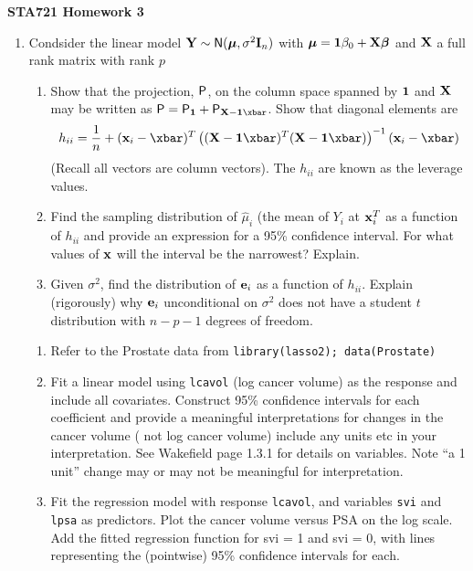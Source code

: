 \documentclass[12pt]{article}
\begin{document}
{\bf STA721 \hfill Homework 3}

\vspace{.5in}


\begin{enumerate}
\item Condsider the linear model $\Y \sim \N(\mub, \sigma^2 \I_n)$
  with  $\mub = \one \beta_0 + \X \b$ and $\X$ a full rank matrix with rank $p$
  \begin{enumerate}
  \item 

    Show that the projection, $\P$, on the column space spanned by
    $\one$ and $\X$ may be written as
    $\P = \P_{\one} + \P_{\X - \one \xbar}$.  Show that diagonal
    elements are
    $$h_{ii} = \frac{1}{n} + (\x_i-\xbar)^T\left((\X- \one \xbar)^T(\X - \one
    \xbar)\right)^{-1}(\x_i - \xbar)$$
    (Recall all vectors are column vectors).  The $h_{ii}$ are known
    as the leverage values.
\item Find the sampling distribution of $\hat{\mu}_i$ (the mean
  of  $Y_i$ at $\x_i^T$ as a function of $h_{ii}$ and provide an
  expression for a 95\% confidence interval.   For what values of $\x$
  will the interval be the narrowest? Explain.

\item Given $\sigma^2$, find the distribution of $\e_i$ as a function
  of $h_{ii}$.  Explain (rigorously) why $\e_i$ unconditional on
    $\sigma^2$ does not have a student $t$ distribution with
    $n - p - 1$ degrees of freedom.
\end{enumerate}
\begin{enumerate}
\item  Refer to the Prostate data  from {\tt library(lasso2); data(Prostate)}
\item Fit a linear model using {\tt lcavol} (log
  cancer volume) as the response and include all covariates.
  Construct 95\% confidence intervals for 
  each coefficient and provide a meaningful interpretations for
  changes in the  cancer volume  ( not log cancer volume) include any
  units etc in your interpretation.   See Wakefield page 1.3.1 for
  details on variables.  Note ``a 1 unit'' change may or may not be
  meaningful for interpretation.   
\item Fit the regression model with
  response {\tt lcavol}, and variables {\tt svi} and {\tt lpsa} as
  predictors.  Plot the cancer volume versus PSA on the log scale. Add
  the fitted regression function for svi = 1 and svi = 0, with
  lines representing the (pointwise) 95\%  confidence intervals for each. 
\end{enumerate}

\end{enumerate}
\end{document}
